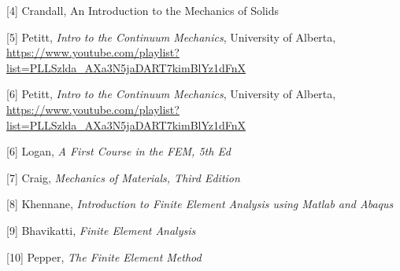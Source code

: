 \documentclass[12pt,fleqn]{article}\usepackage{../../common}
\begin{document}
[4] Crandall, An Introduction to the Mechanics of Solids

[5] Petitt, {\em Intro to the Continuum Mechanics}, University of Alberta,
    \url{https://www.youtube.com/playlist?list=PLLSzlda_AXa3N5jaDART7kimBlYz1dFnX}

[6] Petitt, {\em Intro to the Continuum Mechanics}, University of Alberta,
    \url{https://www.youtube.com/playlist?list=PLLSzlda_AXa3N5jaDART7kimBlYz1dFnX}

[6] Logan, {\em A First Course in the FEM, 5th Ed}

[7] Craig, {\em Mechanics of Materials, Third Edition}

[8] Khennane, {\em Introduction to Finite Element Analysis using Matlab and Abaqus}

[9] Bhavikatti, {\em Finite Element Analysis}    
    
[10] Pepper, {\em The Finite Element Method}
\end{document}
